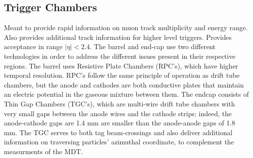     \subsection{Trigger Chambers}
        Meant to provide rapid information on muon track multiplicity and energy range.
        Also provides additional track information for higher level triggers.
        Provides acceptance in range $|\eta| < 2.4$.
        The barrel and end-cap use two different technologies in order to address the different issues present in their respective regions.
        The barrel uses Resistive Plate Chambers (RPC's), which have higher temporal resolution.
        RPC's follow the same principle of operation as drift tube chambers, but the anode and cathodes are both conductive plates that maintain an electric potential in the gaseous mixture between them.
        The endcap consists of Thin Gap Chambers (TGC's), which are multi-wire drift tube chambers with very small gaps between the anode wires and the cathode strips; indeed, the anode-cathode gaps are 1.4 mm are smaller than the anode-anode gaps of 1.8 mm.
        The TGC serves to both tag beam-crossings and also deliver additional information on traversing particles' azimuthal coordinate, to complement the measurments of the MDT.

    
